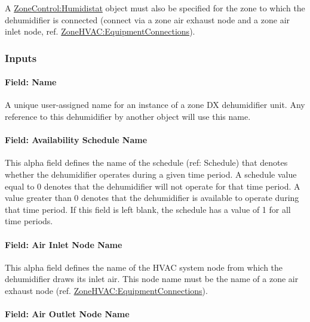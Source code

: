 A \hyperref[zonecontrolhumidistat]{ZoneControl:Humidistat} object must also be specified for the zone to which the dehumidifier is connected (connect via a zone air exhaust node and a zone air inlet node, ref. \hyperref[zonehvacequipmentconnections]{ZoneHVAC:EquipmentConnections}).

\subsubsection{Inputs}\label{inputs-12-021}

\paragraph{Field: Name}\label{field-name-12-014}

A unique user-assigned name for an instance of a zone DX dehumidifier unit. Any reference to this dehumidifier by another object will use this name.

\paragraph{Field: Availability Schedule Name}\label{field-availability-schedule-name-11-001}

This alpha field defines the name of the schedule (ref: Schedule) that denotes whether the dehumidifier operates during a given time period. A schedule value equal to 0 denotes that the dehumidifier will not operate for that time period. A value greater than 0 denotes that the dehumidifier is available to operate during that time period. If this field is left blank, the schedule has a value of 1 for all time periods.

\paragraph{Field: Air Inlet Node Name}\label{field-air-inlet-node-name-9-000}

This alpha field defines the name of the HVAC system node from which the dehumidifier draws its inlet air. This node name must be the name of a zone air exhaust node (ref. \hyperref[zonehvacequipmentconnections]{ZoneHVAC:EquipmentConnections}).

\paragraph{Field: Air Outlet Node Name}\label{field-air-outlet-node-name-9-001}

